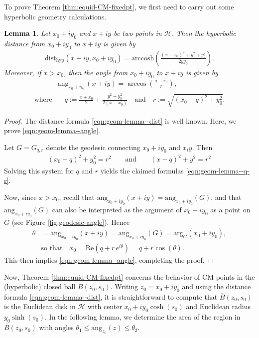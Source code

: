 \documentclass[11pt,letterpaper,reqno]{amsart}
\newtheorem{lemma}[theorem]{Lemma}
\numberwithin{equation}{section}
\numberwithin{figure}{section}
\numberwithin{table}{section}
\newcommand{\lrp}[1]{\left(#1\right)}
\newcommand{\HH}{\mathcal{H}}
\begin{document}
To prove Theorem \ref{thm:equid-CM-fixedpt}, we first need to carry out some hyperbolic geometry calculations.
\begin{lemma} 
    \label{lem:hyp-dist-and-angle}
    Let $x_0 + iy_0$ and $x+iy$ be two points in $\HH$. Then the hyperbolic distance from $x_0+iy_0$ to $x+iy$ is given by
    \begin{align} \label{eqn:geom-lemma--dist}
        \mathrm{dist}_\mathrm{hyp}(x+iy, x_0+iy_0) = \mathrm{arccosh}\lrp{\frac{(x-x_0)^2 + y^2 + y_0^2}{2yy_0}}.
    \end{align}
    Moreover, if $x > x_0$, then the angle from $x_0 + iy_0$ to $x+iy$ is given by
    \begin{align} 
        &\mathrm{ang}_{x_0+iy_0}(x+iy) = \arccos \lrp{\frac{q-x_0}{r}}, 
        \label{eqn:geom-lemma--angle}
        \\
        \text{where}&\quad q := \frac{x+x_0}{2} + \frac{y^2-y_0^2}{2(x-x_0)} \quad \text{and} \quad r := \sqrt{(x_0-q)^2+y_0^2}.
        \label{eqn:geom-lemma--q-r}
    \end{align}
\end{lemma}
\begin{proof}
    The distance formula \eqref{eqn:geom-lemma--dist} is well known. Here, we prove \eqref{eqn:geom-lemma--angle}.

    Let $G=G_{q,r}$ denote the geodesic connecting $x_0+iy_0$ and $x_iy$. Then 
    \begin{align}
        (x_0-q)^2 + y_0^2 = r^2 \qquad \text{and} \qquad (x-q)^2+y^2 = r^2
    \end{align}
    Solving this system for $q$ and $r$ yields the claimed formulas \eqref{eqn:geom-lemma--q-r}. 
    
    Now, since $x > x_0$, recall that $\mathrm{ang}_{x_0+iy_0}(x+iy) = \mathrm{ang}_{x_0+iy_0}(G)$, and that $\mathrm{ang}_{x_0+iy_0}(G)$ can also be interpreted as the argument of $x_0+iy_0$ as a point on $G$ (see Figure \ref{fig:geodesic-angle}). Hence
    \begin{align}
        \theta &= \mathrm{ang}_{x_0+iy_0}(x+iy) = \mathrm{ang}_{x_0+iy_0}(G) = \mathrm{arg}_G(x_0+iy_0), \\
        &\text{so }\text{that}\quad x_0 = \text{Re}(q+r \,e^{i\theta}) = q + r \cos(\theta).
    \end{align}
    This then implies \eqref{eqn:geom-lemma--angle}, completing the proof.
\end{proof}

Now, Theorem \ref{thm:equid-CM-fixedpt} concerns the behavior of CM points in the (hyperbolic) closed ball $\overline B(z_0,s_0)$. Writing $z_0 = x_0 +i y_0$ and using the distance formula \eqref{eqn:geom-lemma--dist}, it is straightforward to compute that $\overline B(z_0,s_0)$ is the Euclidean disk in $\HH$ with center $x_0 + i y_0 \cosh(s_0)$ and Euclidean radius $y_0 \sinh(s_0)$. In the following lemma, we determine the area of the region in $\overline B(z_0,s_0)$ with angles $\theta_1 \le \mathrm{ang}_{z_0}(z) \le \theta_2$.
\end{document}
